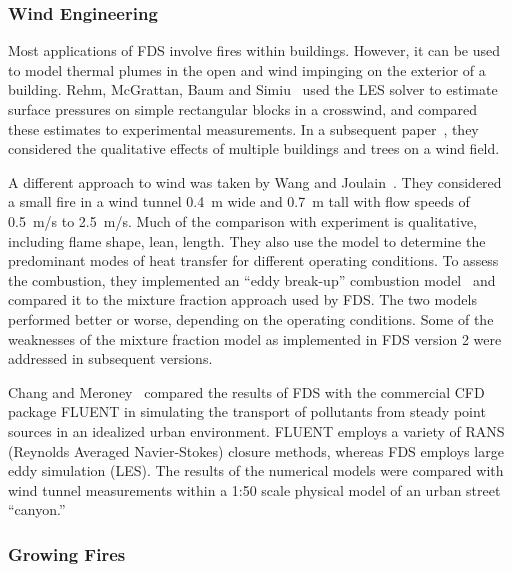 \subsubsection{Wind Engineering}

Most applications  of FDS involve fires within  buildings. However, it can be used to model thermal  plumes in the open and wind impinging on the
exterior   of   a   building.    Rehm,   McGrattan,   Baum   and Simiu~\cite{LES:4} used the LES solver to estimate surface pressures on simple
rectangular blocks in  a crosswind, and compared these estimates to experimental measurements.  In a subsequent paper~\cite{Rehm:WS02}, they considered
the qualitative  effects of multiple buildings and trees on a wind field.

A   different    approach   to   wind    was   taken   by    Wang   and Joulain~\cite{Wang:IAFSS2002}. They  considered a  small fire in  a wind tunnel
0.4~m wide  and  0.7~m tall  with  flow speeds  of 0.5~m/s  to 2.5~m/s.  Much  of  the  comparison with  experiment  is  qualitative, including
flame shape,  lean,  length.  They also  use  the model  to determine  the  predominant  modes  of  heat  transfer  for  different operating
conditions. To  assess  the combustion,  they implemented  an ``eddy break-up''  combustion model~\cite{Magnussen:1} and  compared it to the mixture
fraction approach used by FDS.  The two models performed better or  worse, depending on  the operating conditions. Some  of the weaknesses of the
mixture fraction model as implemented in FDS version 2 were addressed in subsequent versions.

Chang and Meroney~\cite{ChangJWE2003} compared the results of FDS with the  commercial CFD  package  FLUENT in  simulating  the transport  of
pollutants   from  steady   point  sources   in  an   idealized  urban environment.  FLUENT  employs a  variety  of  RANS (Reynolds  Averaged
Navier-Stokes)  closure  methods,   whereas  FDS  employs  large  eddy simulation (LES).   The results of the numerical  models were compared with
wind tunnel measurements within a 1:50 scale physical model of an urban street ``canyon.''


\subsubsection{Growing Fires}
\label{growingfires}

